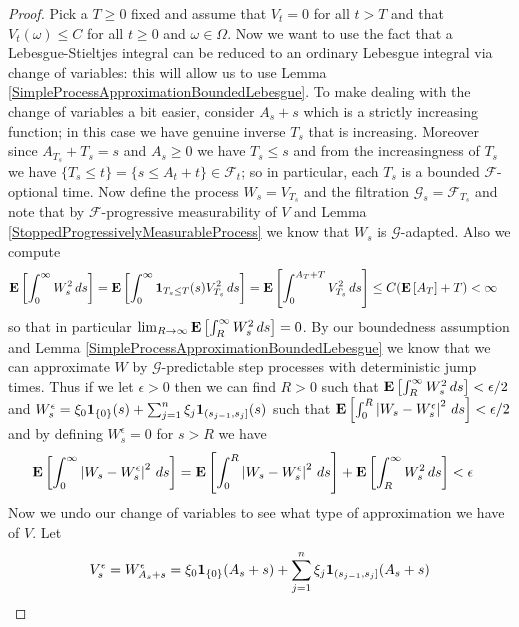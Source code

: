 \begin{proof}
Pick a $T \geq 0$ fixed and assume that $V_t = 0$ for all $t > T$ and that $V_t(\omega) \leq C$ for all $t \geq 0$ and $\omega \in \Omega$.  Now we want to use the fact that a Lebesgue-Stieltjes integral can be reduced to an ordinary Lebesgue integral via change of variables: this will allow us to use Lemma \ref{SimpleProcessApproximationBoundedLebesgue}.  To make dealing with the change of variables a bit easier, consider $A_s + s$ which is a strictly increasing function; in this case we have genuine inverse $T_s$ that is increasing.  Moreover since $A_{T_s}+T_s = s$ and $A_s \geq 0$ we have $T_s \leq s$ and from the increasingness of $T_s$ we have $\lbrace T_s \leq t \rbrace = \lbrace s \leq A_t + t\rbrace \in \mathcal{F}_t$; so in particular, each $T_s$ is a bounded $\mathcal{F}$-optional time.  Now define the process $W_s = V_{T_s}$ and the filtration $\mathcal{G}_s = \mathcal{F}_{T_s}$ and note that by $\mathcal{F}$-progressive measurability of $V$ and Lemma \ref{StoppedProgressivelyMeasurableProcess} we know that $W_s$ is $\mathcal{G}$-adapted.  Also we compute
\begin{align*}
\textbf{E}\left[ \int_0^\infty W_s^2 \, ds\right] &= \textbf{E}\left[ \int_0^\infty \textbf{1}_{T_s \leq T} (s) V_{T_s}^2 \, ds\right] = \textbf{E}\left[ \int_0^{A_T + T} V_{T_s}^2 \, ds\right] \leq C ( \textbf{E}\left[A_T\right]+T) < \infty
\end{align*}
so that in particular $\lim_{R \to \infty} \textbf{E}\left[ \int_R^\infty W_s^2 \, ds\right] = 0$.  
By our boundedness assumption and Lemma  \ref{SimpleProcessApproximationBoundedLebesgue} we know that we can approximate $W$ by $\mathcal{G}$-predictable step processes with deterministic jump times.  Thus if we let $\epsilon > 0$ then we can find $R>0$ such that $\textbf{E}\left[ \int_R^\infty W_s^2 \, ds\right] < \epsilon/2$ and $W^\epsilon_s = \xi_0 \textbf{1}_{\lbrace 0 \rbrace}(s) + \sum_{j=1}^n \xi_j \textbf{1}_{(s_{j-1}, s_j]}(s)$ such that 
$\textbf{E}\left[\int_0^R \left \vert W_s - W_s^\epsilon \right \vert^2 \, ds\right] < \epsilon/2$ and by defining $W^\epsilon_s = 0$ for $s > R$ we have
\begin{align*}
\textbf{E}\left[\int_0^\infty \left \vert W_s - W_s^\epsilon \right \vert^2 \, ds\right] &= \textbf{E}\left[\int_0^R \left \vert W_s - W_s^\epsilon \right \vert^2 \, ds\right]  + \textbf{E}\left[\int_R^\infty W_s^2 \, ds\right] < \epsilon
\end{align*}
Now we undo our change of variables to see what type of approximation we have of $V$.  Let 
\begin{align*}
V^\epsilon_s &= W^\epsilon_{A_s+s} = \xi_0 \characteristic{\lbrace 0 \rbrace}(A_s+s) + \sum_{j=1}^n \xi_j \characteristic{(s_{j-1}, s_j]}(A_s+s) \\

\end{align*}
\end{proof}
